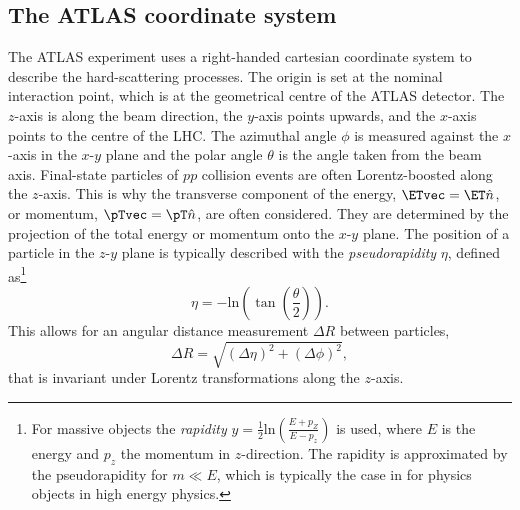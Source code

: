 \subsection{The ATLAS coordinate system}
The ATLAS experiment uses a right-handed cartesian coordinate system to describe the hard-scattering processes. The origin is set at the nominal interaction point, which is at the geometrical centre of the ATLAS detector. The $z$-axis is along the beam direction, the $y$-axis points upwards, and the $x$-axis points to the centre of the LHC. The azimuthal angle $\phi$ is measured against the $x$-axis in the $x$-$y$ plane and the polar angle $\theta$ is the angle taken from the beam axis.
Final-state particles of $pp$ collision events are often Lorentz-boosted along the $z$-axis.
This is why the transverse component of the energy, $\ETvec = \ET \hat{n}$, or momentum, $\pTvec = \pT \hat{n}$, are often considered. They are determined by the projection of the total energy or momentum onto the $x$-$y$ plane.
The position of a particle in the $z$-$y$ plane is typically described with the \emph{pseudorapidity} $\eta$, defined as\footnote{For massive objects the \emph{rapidity} $y = \frac{1}{2} \text{ln} \left( \frac{E + p_Z }{E-p_z} \right)$ is used, where $E$ is the energy and $p_z$ the momentum in $z$-direction. The rapidity is approximated by the pseudorapidity for $m \ll E$, which is typically the case in for physics objects in high energy physics.}
\begin{equation}
    \eta = - \text{ln} \left( \tan \left( \frac{\theta}{2} \right) \right).
\end{equation}
This allows for an angular distance measurement $\Delta R$ between particles,
\begin{equation}
    \label{eq:delta-r}
    \Delta R = \sqrt{ \left( \Delta \eta \right) ^2 + \left( \Delta \phi \right) ^2 },
\end{equation}
that is invariant under Lorentz transformations along the $z$-axis.


